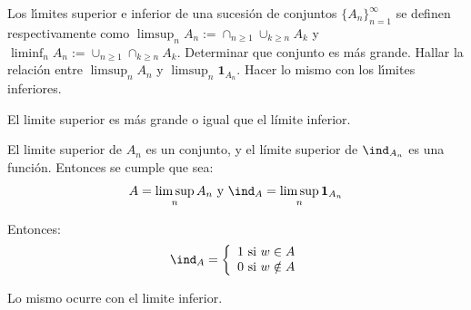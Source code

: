 \begin{problem}[6] Los l\'{\i}mites superior e inferior de una sucesi\'on de conjuntos  $\{A_n\}_{n=1}^{\infty}  $ se
definen respectivamente como $\limsup_n A_n := \cap_{n\ge 1 } \cup_{k\ge n } A_k$ y 
$\liminf_n A_n := \cup_{n\ge 1 } \cap_{k\ge n } A_k$. Determinar que conjunto es m\'as grande.
Hallar la relaci\'on entre  $\limsup_n A_n$ y  $\limsup_n \mathbf{1}_{ A_n}$. Hacer lo mismo con los
 l\'{\i}mites inferiores.



\solution


El limite superior es más grande o igual que el límite inferior.

El limite superior de $A_n$ es un conjunto, y el límite superior de $\ind_{A_n}$ es una función. Entonces se cumple que sea:
\[
A = \limsup_n A_n \text{ y } \ind_A = \limsup_n \mathbf{1}_{ A_n}
\]

Entonces:
\[
\ind_A =
  \left\lbrace
  \begin{array}{l}
  	  1 \text{ si } w \in A\\
  	  0 \text{ si } w \notin A\\
  \end{array}
  \right.
\]

Lo mismo ocurre con el limite inferior.

\end{problem}


